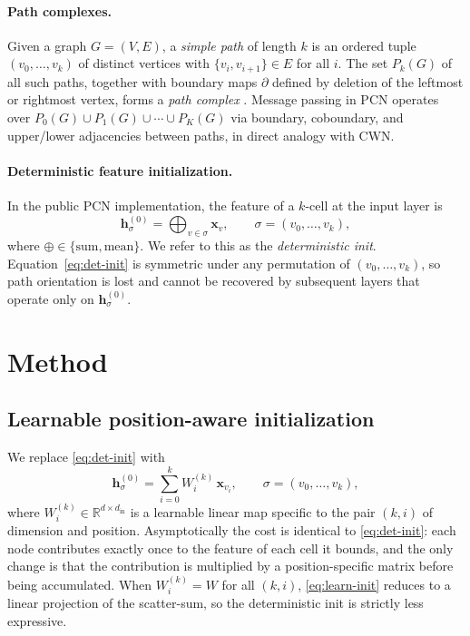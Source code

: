 \documentclass[11pt]{article}
\newcommand{\pcn}{\textsc{PCN}}
\newcommand{\cwn}{\textsc{CWN}}
\begin{document}
\paragraph{Path complexes.}
Given a graph $G=(V,E)$, a \emph{simple path} of length $k$ is an
ordered tuple $(v_0,\ldots,v_k)$ of distinct vertices with
$\{v_i,v_{i+1}\}\in E$ for all $i$. The set $P_k(G)$ of all such
paths, together with boundary maps $\partial$ defined by deletion of
the leftmost or rightmost vertex, forms a \emph{path complex}
\citep{grigoryan2012homologies,truong2024pcn}. Message passing in
\pcn{} operates over $P_0(G)\cup P_1(G)\cup\cdots\cup P_K(G)$ via
boundary, coboundary, and upper/lower adjacencies between paths, in
direct analogy with \cwn{}.

\paragraph{Deterministic feature initialization.}
In the public \pcn{} implementation, the feature of a $k$-cell at the
input layer is
\begin{equation}
  \mathbf{h}^{(0)}_{\sigma} = \bigoplus_{v\in\sigma} \mathbf{x}_v,
  \qquad \sigma=(v_0,\ldots,v_k),
  \label{eq:det-init}
\end{equation}
where $\oplus\in\{\text{sum},\text{mean}\}$. We refer to this as the
\emph{deterministic init}. Equation~\eqref{eq:det-init} is symmetric
under any permutation of $(v_0,\ldots,v_k)$, so path orientation is
lost and cannot be recovered by subsequent layers that operate only on
$\mathbf{h}^{(0)}_\sigma$.

\section{Method}

\subsection{Learnable position-aware initialization}

We replace \eqref{eq:det-init} with
\begin{equation}
  \mathbf{h}^{(0)}_{\sigma}
  = \sum_{i=0}^{k} W_i^{(k)}\,\mathbf{x}_{v_i},
  \qquad \sigma=(v_0,\ldots,v_k),
  \label{eq:learn-init}
\end{equation}
where $W_i^{(k)}\in\mathbb{R}^{d\times d_\text{in}}$ is a learnable
linear map specific to the pair $(k,i)$ of dimension and position.
Asymptotically the cost is identical to \eqref{eq:det-init}: each node
contributes exactly once to the feature of each cell it bounds, and
the only change is that the contribution is multiplied by a
position-specific matrix before being accumulated. When $W_i^{(k)}=W$
for all $(k,i)$, \eqref{eq:learn-init} reduces to a linear projection
of the scatter-sum, so the deterministic init is strictly less
expressive.
\end{document}
